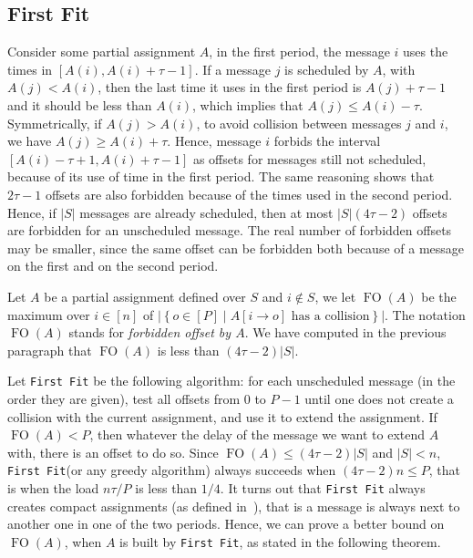 \documentclass[a4paper,UKenglish,cleveref, autoref, thm-restate]{lipics-v2019}
\DeclareMathOperator{\Fo}{FO}
\newcommand\firstfit{\texttt{First Fit}\xspace}
\begin{document}
\subsection{First Fit}


Consider some partial assignment $A$, in the first period, the message $i$ uses the times in $[A(i), A(i) + \tau -1]$. If a message $j$ is scheduled by $A$, with $A(j) < A(i)$, then the last time it uses in the first period is $A(j)+\tau-1$ and it should be less than $A(i)$, which implies that $A(j) \leq A(i) - \tau$. Symmetrically, if $A(j) > A(i)$, to avoid collision between messages $j$ and $i$, we have $A(j) \geq A(i) + \tau$. Hence, message $i$ forbids the interval $[A(i) - \tau +1, A(i) + \tau -1]$ as offsets for messages still not scheduled, because of its use of time in the first period. The same reasoning shows that $2\tau -1$ offsets are also forbidden because of the times used in the second period. Hence, if $|S|$ messages are already scheduled, then at most $|S|(4\tau -2)$ offsets are forbidden for an unscheduled message. The real number of forbidden offsets may be smaller, since the same offset can be forbidden both because of a message on the first and on the second period.

Let $A$ be a partial assignment defined over $S$ and $i\notin S$, we let $\Fo(A)$ be the maximum over $i \in [n]$ of $|\left\{ o \in [P] \mid A[i \rightarrow o] \text{ has a collision}\right\}|$. 
The notation $\Fo(A)$ stands for \emph{forbidden offset by $A$}. We have computed in the previous paragraph that $\Fo(A)$ is less than $(4 \tau -2)|S|$. 

Let \firstfit be the following algorithm:  for each unscheduled message (in the order they are given), test all offsets from $0$ to $P-1$ until one does not create a collision with the current assignment, and use it to extend the assignment. If $\Fo(A) < P$, then whatever the delay of the message we want to extend $A$ with, there is an offset to do so. Since $\Fo(A) \leq (4 \tau -2)|S|$ and $|S| < n$, \firstfit (or any greedy algorithm) always succeeds when $(4 \tau -2)n \leq P$, that is when the load $ n\tau /P$ is less than $1/4$.
It turns out that \firstfit always creates compact assignments (as defined in~\cite{dominique2018deterministic}), that is a message is always next to another one in one of the two periods. Hence, we can prove a better bound on $\Fo(A)$, when $A$ is built by \firstfit, as stated in the following theorem.
\end{document}
